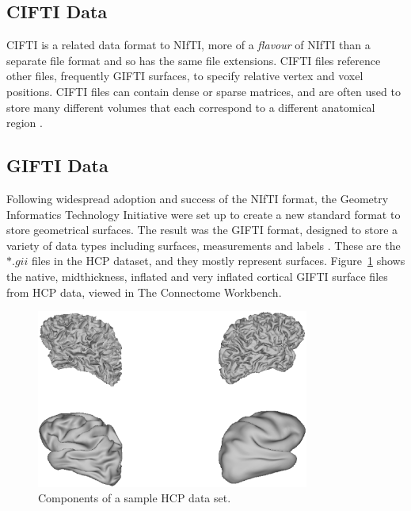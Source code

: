 \documentclass[MSc,paper=a4,pagesize=auto]{icldt}
\begin{document}
\subsection{CIFTI Data}
CIFTI is a related data format to NIfTI, more of a \textit{flavour} of NIfTI than a separate file format and so has the same file extensions. CIFTI files reference other files, frequently GIFTI surfaces, to specify relative vertex and voxel positions. CIFTI files can contain dense or sparse matrices, and are often used to store many different volumes that each correspond to a different anatomical region \cite{WorkbenchGlossary2014}. 

\subsection{GIFTI Data}
Following widespread adoption and success of the NIfTI format, the Geometry Informatics Technology Initiative were set up to create a new standard format to store geometrical surfaces. The result was the GIFTI format, designed to store a variety of data types including surfaces, measurements and labels \cite{Harwell2011}. These are the $\ast.gii$ files in the HCP dataset, and they mostly represent surfaces. Figure~\ref{fig:connectome_gifti} shows the native, midthickness, inflated and very inflated cortical GIFTI surface files from HCP data, viewed in The Connectome Workbench.

\begin{figure}[htbp!]
    \centering
    \includegraphics[width=0.8\textwidth]{resources/connectome_gifti}
    \caption{Components of a sample HCP data set.}
    \label{fig:connectome_gifti}
\end{figure}
\end{document}
